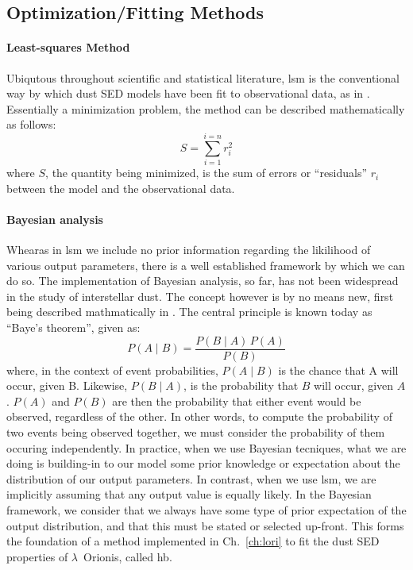        \subsection{Optimization/Fitting Methods}

       \paragraph{Least-squares Method}

        Ubiqutous throughout scientific and statistical literature, \gls{lsm} is the conventional way by which dust SED models have been fit to observational data, as in \cite{tibbs11}. Essentially a minimization problem, the method can be described mathematically as follows:
        \begin{equation}
             S=\sum_{i=1}^{i=n}r_i^2
        \end{equation}
        where $S$, the quantity being minimized, is the sum of errors or ``residuals'' $r_{i}$ between the model  and the observational data.

       \paragraph{Bayesian analysis}

       Whearas in \gls{lsm} we include no prior information regarding the likilihood of various output parameters, there is a well established framework by which we can do so.  The implementation of Bayesian analysis, so far, has not been widespread in the study of interstellar dust. The concept however is by no means new, first being described mathmatically in \cite{bayes1763}. The central principle is known today as ``Baye's theorem'', given as:
           \begin{equation}
               P(A\mid{} B) = \frac{P(B \mid{} A) \, P(A)}{P(B)}
           \end{equation}
        where, in the context of event probabilities, $P(A\mid{} B)$ is the chance that A will occur, given B. Likewise, $P(B\mid{} A)$, is the probability that $B$ will occur, given $A$. $P(A)$ and $P(B)$ are then the probability that either event would be observed, regardless of the other. In other words, to compute the probability of two events being observed together, we must consider the probability of them occuring independently. In practice, when we use Bayesian tecniques, what we are doing is building-in to our model some prior knowledge or expectation about the distribution of our output parameters. In contrast, when we use \gls{lsm}, we are implicitly assuming that any output value is equally likely. In the Bayesian framework, we consider that we always have some type of prior expectation of the output distribution, and that this must be stated or selected up-front. This forms the foundation of a method implemented in Ch.~\ref{ch:lori} to fit the dust SED properties of $\lambda$~Orionis, called \gls{hb}.

